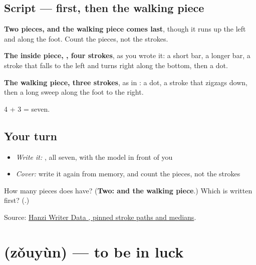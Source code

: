 \subsection*{Script —  first, then the walking piece}

\begin{quote}
\end{quote}

\textbf{Two pieces, and the walking piece comes last}, though it runs up the left and along the foot. Count the pieces, not the strokes.

\textbf{The inside piece, , four strokes}, as you wrote it: a short bar, a longer bar, a stroke that falls to the left and turns right along the bottom, then a dot.

\textbf{The walking piece, three strokes}, as in : a dot, a stroke that zigzags down, then a long sweep along the foot to the right.

4 + 3 = seven.

\subsection*{Your turn}
\begin{itemize}
\raggedright
  \item \emph{Write it:} , all seven, with the model in front of you
  \item \emph{Cover:} write it again from memory, and count the pieces, not the strokes
\end{itemize}

\begin{tcolorbox}[breakable,colback=teal!4,colframe=teal!35!black,title={Before you move on}]
How many pieces does  have? (\textbf{Two:  and the walking piece}.) Which is written first? (\textbf{}.)

Source: \href{https://raw.githubusercontent.com/chanind/hanzi-writer-data/68d10a4b21150cae5e1ebbd223eed289cf32d90c/data/\%E8\%BF\%90.json}{Hanzi Writer Data , pinned stroke paths and medians}.
\end{tcolorbox}
\section[\texorpdfstring{\zh{走运} (zǒuyùn)}{走运 (zǒuyùn)}]{ (zǒuyùn) — to be in luck}

